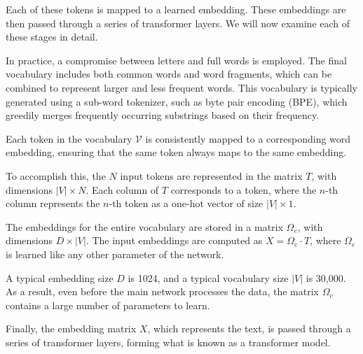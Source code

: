 Each of these tokens is mapped to a learned embedding. These embeddings are then
passed through a series of transformer layers. We will now examine each of these
stages in detail.

In practice, a compromise between letters and full words is employed. The final
vocabulary includes both common words and word fragments, which can be combined
to represent larger and less frequent words. This vocabulary is typically generated
using a sub-word tokenizer, such as byte pair encoding (BPE), which greedily merges
frequently occurring substrings based on their frequency.

Each token in the vocabulary $\mathcal{V}$ is consistently mapped to a corresponding
word embedding, ensuring that the same token always maps to the same embedding.

To accomplish this, the $N$ input tokens are represented in the matrix $T$, with
dimensions $|V| \times N$. Each column of $T$ corresponds to a token, where the
$n$-th column represents the $n$-th token as a one-hot vector of size $|V| \times 1$.

The embeddings for the entire vocabulary are stored in a matrix $\Omega_e$, with
dimensions $D \times |V|$. The input embeddings are computed as $X = \Omega_e \cdot T$,
where $\Omega_e$ is learned like any other parameter of the network.

A typical embedding size $D$ is 1024, and a typical vocabulary size $|V|$ is 30,000.
As a result, even before the main network processes the data, the matrix $\Omega_e$
contains a large number of parameters to learn.

Finally, the embedding matrix $X$, which represents the text, is passed through
a series of transformer layers, forming what is known as a transformer model.


